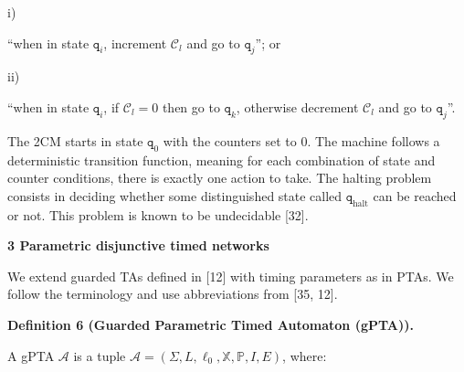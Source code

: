 \par\noindent  i) 
 
“when in state $\mathtt{q}_{i}$, increment $\mathcal{C}_{l}$ and go to $\mathtt{q}_{j}$”; or\par
 
 
 
\par\noindent  ii) 
 
“when in state $\mathtt{q}_{i}$, if $\mathcal{C}_{l}=0$ then go to $\mathtt{q}_{k}$, otherwise decrement $\mathcal{C}_{l}$ and go to $\mathtt{q}_{j}$”.\par
 
 
  
 
 
The 2CM starts in state $\mathtt{q}_{0}$ with the counters set to 0. The machine follows a deterministic transition function, meaning for each combination of state and counter conditions, there is exactly one action to take. The halting problem consists in deciding whether some distinguished state called $\mathtt{q}_{\textrm{halt}}$ can be reached or not. This problem is known to be undecidable [32].\par
 
 
 


 
\par\medskip\noindent\textbf{3 Parametric disjunctive timed networks}\par
 
 
We extend guarded TAs defined in [12] with timing parameters as in PTAs. We follow the terminology and use abbreviations from [35, 12].\par
 
 
 
\par\medskip\noindent\textbf{Definition 6 (Guarded Parametric Timed Automaton (gPTA)).}\par
 
 
A gPTA $\mathcal{A}$ is a tuple $\mathcal{A}=(\Sigma,L,\mathrm{\mathrm{\ell}_{0}},\mathbb{X},\mathbb{P},I,E)$, where:\par
  

